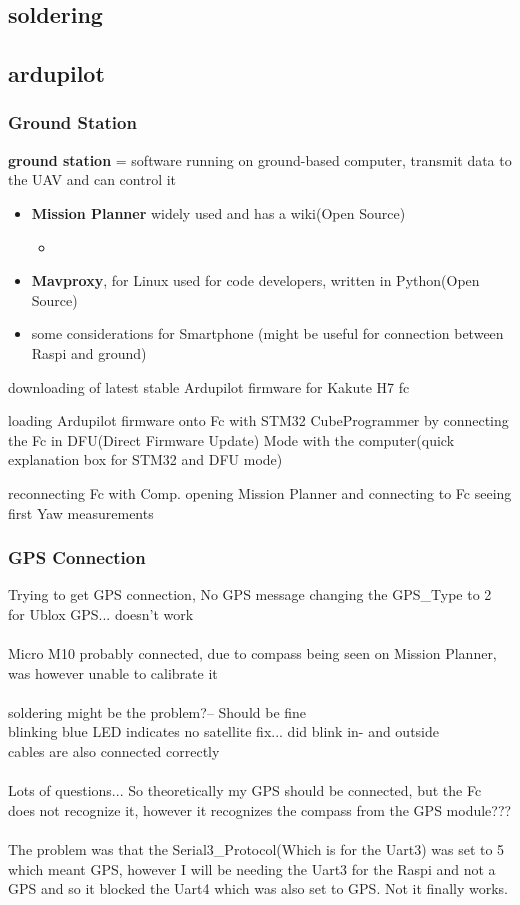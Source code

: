 \documentclass{article}
\begin{document}
	
	
	\subsection{soldering}
	
	\subsection{ardupilot}
	\subsubsection{Ground Station}
	\textbf{ground station} = software running on ground-based computer, transmit data to the UAV and can control it
	\begin{itemize}
		\item \textbf{Mission Planner} widely used and has a wiki(Open Source)
		\begin{itemize}
			\item 
		\end{itemize}
		\item \textbf{Mavproxy}, for Linux used for code developers, written in Python(Open Source)
		\item some considerations for Smartphone (might be useful for connection between Raspi and ground)
	\end{itemize}
	downloading of latest stable Ardupilot firmware for Kakute H7 fc	
	
	loading Ardupilot firmware onto Fc with STM32 CubeProgrammer by connecting the Fc in DFU(Direct Firmware Update) Mode with the computer(quick explanation box for STM32 and DFU mode)
	
	reconnecting Fc with Comp. 
	opening Mission Planner and connecting to Fc seeing first Yaw measurements 
	\subsubsection{GPS Connection}
	
	Trying to get GPS connection, No GPS message
	changing the GPS\_Type to 2 for Ublox GPS... doesn't work
	\\
	\\ Micro M10 probably connected, due to compass being seen on Mission Planner, was however unable to calibrate it
	\\
	\\ soldering might be the problem?-- Should be fine
	\\ blinking blue LED indicates no satellite fix... did blink in- and outside
	\\ cables are also connected correctly
	\\
	\\ Lots of questions... So theoretically my GPS should be connected, but the Fc does not recognize it, however it recognizes the compass from the GPS module???
	\\
	\\ The problem was that the Serial3\_Protocol(Which is for the Uart3) was set to 5 which meant GPS, however I will be needing the Uart3 for the Raspi and not a GPS and so it blocked the Uart4 which was also set to GPS. Not it finally works.
\end{document}
